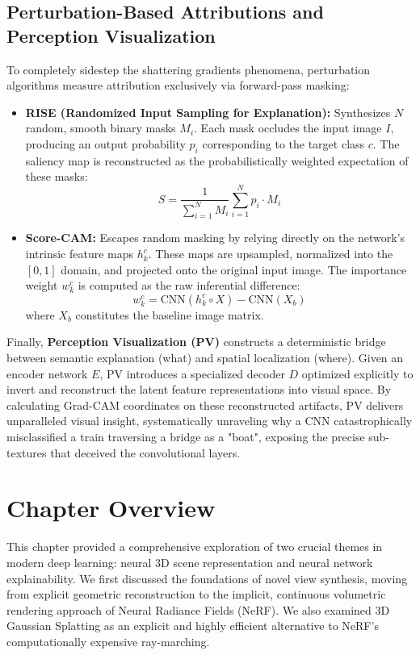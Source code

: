 \subsection{Perturbation-Based Attributions and Perception Visualization}
To completely sidestep the shattering gradients phenomena, perturbation algorithms measure attribution exclusively via forward-pass masking:
\begin{itemize}
    \item \textbf{RISE (Randomized Input Sampling for Explanation):} Synthesizes $N$ random, smooth binary masks $M_i$. Each mask occludes the input image $I$, producing an output probability $p_i$ corresponding to the target class $c$. The saliency map is reconstructed as the probabilistically weighted expectation of these masks:
    \begin{equation}
    S = \frac{1}{\sum_{i=1}^N M_i} \sum_{i=1}^N p_i \cdot M_i
    \end{equation}
    \item \textbf{Score-CAM:} Escapes random masking by relying directly on the network's intrinsic feature maps $h_k^c$. These maps are upsampled, normalized into the $[0,1]$ domain, and projected onto the original input image. The importance weight $w_k^c$ is computed as the raw inferential difference:
    \begin{equation}
    w_k^c = \text{CNN}(h_k^c \circ X) - \text{CNN}(X_b)
    \end{equation}
    where $X_b$ constitutes the baseline image matrix.
\end{itemize}

Finally, \textbf{Perception Visualization (PV)} constructs a deterministic bridge between semantic explanation (what) and spatial localization (where). Given an encoder network $E$, PV introduces a specialized decoder $D$ optimized explicitly to invert and reconstruct the latent feature representations into visual space. By calculating Grad-CAM coordinates on these reconstructed artifacts, PV delivers unparalleled visual insight, systematically unraveling why a CNN catastrophically misclassified a train traversing a bridge as a "boat", exposing the precise sub-textures that deceived the convolutional layers.

\section{Chapter Overview}

This chapter provided a comprehensive exploration of two crucial themes in modern deep learning: neural 3D scene representation and neural network explainability. We first discussed the foundations of novel view synthesis, moving from explicit geometric reconstruction to the implicit, continuous volumetric rendering approach of Neural Radiance Fields (NeRF). We also examined 3D Gaussian Splatting as an explicit and highly efficient alternative to NeRF's computationally expensive ray-marching.

